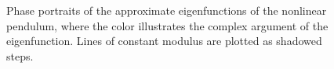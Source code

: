 \begin{figure}[h]
\centering
{}
        \caption{Phase portraits of the approximate eigenfunctions of the nonlinear pendulum, where the color illustrates the complex argument of the eigenfunction. Lines of constant modulus are plotted as shadowed steps.}
        \label{pendulum_phase_portraits}
\end{figure}


